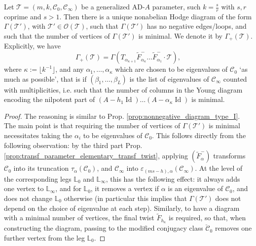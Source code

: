 \documentclass[11pt,a4paper]{amsart}
\numberwithin{equation}{section}
\DeclareMathOperator{\Id}{Id}
\begin{document}
\begin{proposition}
\label{prop:nonnegative_diagram_general_case}
Let $\mathcal T=(m,k, \mathcal C_0, \mathcal C_\infty)$ be a generalized  AD-$A$ parameter, such $k=\frac{s}{r}$ with $s,r$ coprime and $s>1$. Then there is a unique nonabelian Hodge  diagram of the form $\Gamma(\mathcal T')$, with $\mathcal T' \in \mathcal O(\mathcal T)$, such that $\Gamma(\mathcal T')$ has no negative edges/loops, and such that the number of vertices of $\Gamma(\mathcal T')$ is minimal. We denote it by $\Gamma_+(\mathcal T)$. Explicitly, we have
\[
\Gamma_+(\mathcal T)=
\Gamma(T_{\alpha_{\kappa+1}}\widetilde{F}_{\alpha_\kappa}^-\dots \widetilde{F}_{\alpha_1}^- \cdot \mathcal T),
\]
where $\kappa:=\lfloor k^{-1}\rfloor$, and  any $\alpha_1, \dots,\alpha_\kappa$ which are chosen to be eigenvalues of $\mathcal C_0$ `as much as possible', that is if $(\beta_1, \dots, \beta_L)$ is the list of eigenvalues of $\mathcal C_\infty$ counted with multiplicities, i.e. such that the number of columns in the Young diagram encoding the nilpotent part of $(A-h_1\Id)\dots (A-\alpha_\kappa\Id)$ is minimal. 
\end{proposition}

\begin{proof}

The reasoning is similar to Prop. \ref{prop:nonnegative_diagram_type_I}. The main point is that requiring the number of vertices of $\Gamma(\mathcal T')$ is minimal necessitates taking the $\alpha_i$ to be eigenvalues of $\mathcal C_0$. This follows directly from the following observation: by the third part Prop. \ref{prop:transf_parameter_elementary_transf_twist}, applying $(\widetilde{F}^-_\alpha)$ transforms $\mathcal C_0$ into its truncation $\tau_\alpha(\mathcal C_0)$, and $\mathcal C_\infty$ into $\varepsilon_{(ms-h),\alpha}(\mathcal C_\infty)$. At the level of the corresponding legs $\mathbb L_0$ and $\mathbb L_\infty$, this has the following effect: it always adds one vertex to $\mathbb L_\infty$, and for $\mathbb L_0$, it removes a vertex if $\alpha$ is an eigenvalue of $\mathcal C_0$, and does not change $\mathbb L_0$ otherwise (in particular this implies that $\Gamma(\mathcal T')$ does not depend on the choice of eigenvalue at each step). Similarly, to have a diagram with a minimal number of vertices, the final twist $\widetilde{F}_{h_\kappa}$ is required, so that, when constructing the diagram, passing to the modified conjugacy class $\breve{\mathcal C}_0$ removes one further vertex from  the leg $\mathbb L_0$. 
\end{proof}
\end{document}
